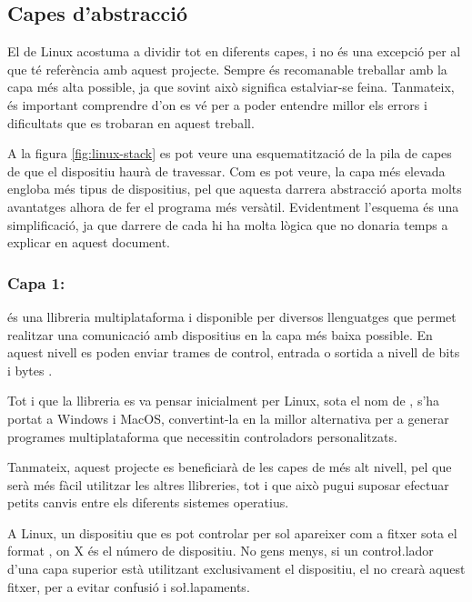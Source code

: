 \subsection{Capes d'abstracció}

El  de Linux acostuma a dividir tot en diferents capes, i no és una
excepció per al que té referència amb aquest projecte. Sempre és recomanable
treballar amb la capa més alta possible, ja que sovint això significa
estalviar-se feina. Tanmateix, és important comprendre d'on es vé per a
poder entendre millor els errors i dificultats que es trobaran en aquest treball.

A la figura \ref{fig:linux-stack} es pot veure una esquematització de la pila
de capes de  que el dispositiu haurà de travessar. Com es pot
veure, la capa més elevada engloba més tipus de dispositius, pel que aquesta
darrera abstracció aporta molts avantatges alhora de fer el programa més
versàtil. Evidentment l'esquema és una simplificació, ja que darrere de cada
 hi ha molta lògica que no donaria temps a explicar en aquest
document.



\subsubsection*{Capa 1: }

 és una llibreria multiplataforma i disponible per diversos
llenguatges que permet realitzar una comunicació amb dispositius  en
la capa més baixa possible. En aquest nivell es poden enviar trames de control,
entrada o sortida a nivell de bits i bytes \cite{Libusb}.

Tot i que la llibreria es va pensar inicialment per Linux, sota el nom de
 \cite{LinuxUsb}, s'ha portat a Windows i MacOS,
convertint-la en la millor alternativa per a generar programes multiplataforma
que necessitin controladors personalitzats.

Tanmateix, aquest projecte es beneficiarà de les capes de més alt nivell, pel que
serà més fàcil utilitzar les altres llibreries, tot i que això pugui suposar
efectuar petits canvis entre els diferents sistemes operatius.

A Linux, un dispositiu que es pot controlar per  sol apareixer com
a fitxer sota el format , on X és el número de dispositiu.
No gens menys, si un contro\l.lador d'una capa superior està utilitzant
exclusivament el dispositiu, el  no crearà aquest fitxer, per a
evitar confusió i so\l.lapaments.

